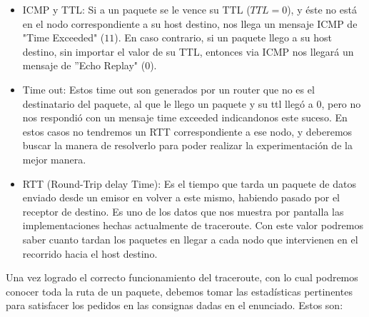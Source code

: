 \begin{itemize}
\item ICMP y TTL: Si a un paquete se le vence su TTL ($TTL = 0$), y \'este no est\'a en el nodo correspondiente a su host destino, nos llega un mensaje ICMP de "Time Exceeded" ($11$). En caso contrario, si un paquete llego a su host destino, sin importar el valor de su TTL, entonces via ICMP nos llegar\'a un mensaje de ''Echo Replay" ($0$).

\item Time out: Estos time out son generados por un router que no es el destinatario del paquete, al que le llego un paquete y su ttl llegó a $0$, pero no nos respondió con un mensaje time exceeded indicandonos este suceso. En estos casos no tendremos un RTT correspondiente a ese nodo, y deberemos buscar la manera de resolverlo para poder realizar la experimentación de la mejor manera.

\item RTT (Round-Trip delay Time): Es el tiempo que tarda un paquete de datos enviado desde un emisor en volver a este mismo, habiendo pasado por el receptor de destino. Es uno de los datos que nos muestra por pantalla las implementaciones hechas actualmente de traceroute. Con este valor podremos saber cuanto tardan los paquetes en llegar a cada nodo que intervienen en el recorrido hacia el host destino.

\end{itemize}

Una vez logrado el correcto funcionamiento del traceroute, con lo cual podremos conocer toda la ruta de un paquete, debemos tomar las estadísticas pertinentes para satisfacer los pedidos en las consignas dadas en el enunciado. Estos son:

